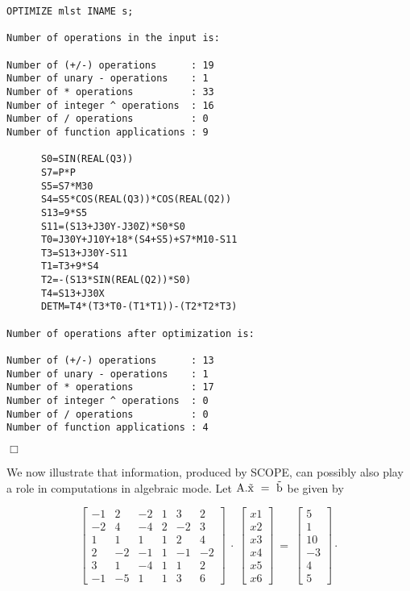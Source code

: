 {\small
\begin{verbatim}
OPTIMIZE mlst INAME s;

Number of operations in the input is: 

Number of (+/-) operations      : 19
Number of unary - operations    : 1
Number of * operations          : 33
Number of integer ^ operations  : 16
Number of / operations          : 0
Number of function applications : 9

      S0=SIN(REAL(Q3))
      S7=P*P
      S5=S7*M30
      S4=S5*COS(REAL(Q3))*COS(REAL(Q2))
      S13=9*S5
      S11=(S13+J30Y-J30Z)*S0*S0
      T0=J30Y+J10Y+18*(S4+S5)+S7*M10-S11
      T3=S13+J30Y-S11
      T1=T3+9*S4
      T2=-(S13*SIN(REAL(Q2))*S0)
      T4=S13+J30X
      DETM=T4*(T3*T0-(T1*T1))-(T2*T2*T3)

Number of operations after optimization is:

Number of (+/-) operations      : 13
Number of unary - operations    : 1
Number of * operations          : 17
Number of integer ^ operations  : 0
Number of / operations          : 0
Number of function applications : 4
\end{verbatim}
\begin{flushright}
$\Box$
\end{flushright}}
\example\label{ex:3.2.6}

We now illustrate that information, produced by SCOPE, can possibly also play 
a role in computations in algebraic mode.  Let ${\rm A.\vec{x}~=~\vec{b}}$ 
be given by

 \[ \left[ \begin{array}{rrrrrr}
                             -1 & 2  & -2 & 1 & 3 & 2 \\
                             -2 & 4  & -4 & 2 & -2 & 3 \\
                              1 & 1  &  1 & 1 & 2 & 4 \\
                              2 & -2 & -1 & 1 & -1 & -2 \\
                              3 & 1  & -4 & 1 & 1 & 2 \\
                             -1 & -5 &  1 & 1 & 3 & 6
      \end{array}\right]~\cdot~\left[ \begin{array}{c}
                                 x1 \\ x2 \\ x3 \\ x4 \\ x5 \\ x6
                               \end{array} \right]~=~
                               \left[ \begin{array}{r}
                                 5 \\ 1 \\ 10 \\ -3 \\ 4 \\ 5
                               \end{array} \right] \cdot \]

